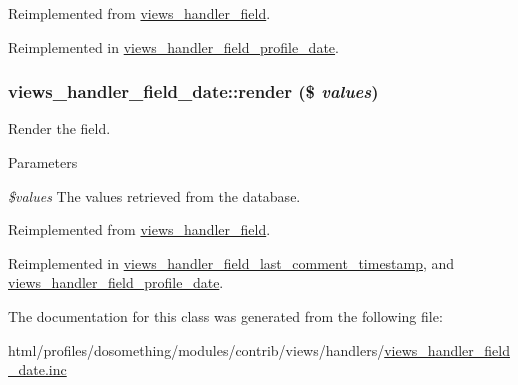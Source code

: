 Reimplemented from \hyperlink{classviews__handler__field_a0435d161922b7b4b84f02a2e79bb947a}{views\_\-handler\_\-field}.

Reimplemented in \hyperlink{classviews__handler__field__profile__date_aede3f5f93411ff64dd780b9837d19aec}{views\_\-handler\_\-field\_\-profile\_\-date}.\hypertarget{classviews__handler__field__date_a4ed821df9270dc90bd3c2103d7136d47}{
\subsubsection[{render}]{\setlength{\rightskip}{0pt plus 5cm}views\_\-handler\_\-field\_\-date::render (\$ {\em values})}}
\label{classviews__handler__field__date_a4ed821df9270dc90bd3c2103d7136d47}
Render the field.


\begin{DoxyParams}{Parameters}
\item[{\em \$values}]The values retrieved from the database. \end{DoxyParams}


Reimplemented from \hyperlink{classviews__handler__field_a82ff951c5e9ceb97b2eab86f880cbc1e}{views\_\-handler\_\-field}.

Reimplemented in \hyperlink{classviews__handler__field__last__comment__timestamp_ac11bf8393ddb71cd12771cb8b516876a}{views\_\-handler\_\-field\_\-last\_\-comment\_\-timestamp}, and \hyperlink{classviews__handler__field__profile__date_acac0d13ae857ccb63e8fe338c8e4dde4}{views\_\-handler\_\-field\_\-profile\_\-date}.

The documentation for this class was generated from the following file:\begin{DoxyCompactItemize}
\item 
html/profiles/dosomething/modules/contrib/views/handlers/\hyperlink{views__handler__field__date_8inc}{views\_\-handler\_\-field\_\-date.inc}\end{DoxyCompactItemize}
